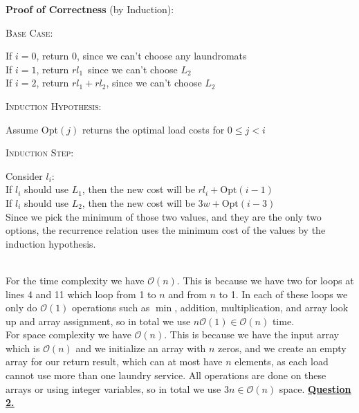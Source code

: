 \documentclass[12pt]{article}
\begin{document}
\newpage
\textbf{Proof of Correctness} (by Induction):
\begin{adjustwidth}{10mm}{}
	\textsc{Base Case}:
	\begin{adjustwidth}{10mm}{}
		If $i = 0$, return 0, since we can't choose any laundromats\\
		If $i = 1$, return $rl_1$\, since we can't choose $L_2$\\
		If $i = 2$, return $rl_1 + rl_2$, since we can't choose $L_2$
	\end{adjustwidth}
	\textsc{Induction Hypothesis}:
	\begin{adjustwidth}{10mm}{}
		Assume Opt$(j)$ returns the optimal load costs for $0\leq j < i$
	\end{adjustwidth}
	\textsc{Induction Step}:
	\begin{adjustwidth}{10mm}{}
		Consider $l_i$:\\
		If $l_i$ should use $L_1$, then the new cost will be $rl_i + \text{Opt}(i-1)$\\
		If $l_i$ should use $L_2$, then the new cost will be $3w + \text{Opt}(i-3)$\\
		Since we pick the minimum of those two values, and they are the only two options, the recurrence relation uses the minimum cost of the values by the induction hypothesis.
	\end{adjustwidth}
\end{adjustwidth}~\\[-8mm]

For the time complexity we have $\mathcal{O}(n)$. This is because we have two for loops at lines 4 and 11 which loop from 1 to $n$ and from $n$ to 1.
In each of these loops we only do $\mathcal{O}(1)$ operations such as $\min$, addition, multiplication, and array look up and array assignment,
so in total we use $n\mathcal{O}(1) \in \mathcal{O}(n)$ time.\\

For space complexity we have $\mathcal{O}(n)$. This is because we have the input array which is $\mathcal{O}(n)$ and we initialize an array with $n$ zeros,
and we create an empty array for our return result, which can at most have $n$ elements, as each load cannot use more than one laundry service.
All operations are done on these arrays or using integer variables, so in total we use $3n\in \mathcal{O}(n)$ space.
\newpage
\hyperlink{toc}{\hypertarget{2}{\LARGE \underline{\textbf{Question 2.}}}}\\
\end{document}
